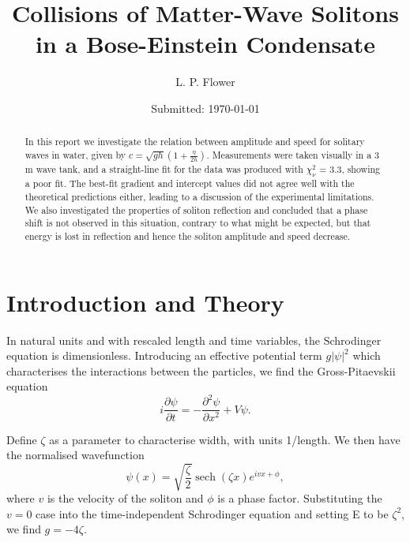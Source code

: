 \documentclass[10pt, twocolumn]{revtex4}    %
\DeclareMathOperator{\sech}{sech}		%
\begin{document}
                     


\title{Collisions of Matter-Wave Solitons in a Bose-Einstein Condensate} 
\date{Submitted: \today{}}
\author{L. P. Flower}

\begin{abstract}              
 
In this report we investigate the relation between amplitude and speed for solitary waves in water, given by $c = \sqrt{gh} \left(1 + \frac{\eta}{2h} \right)$. Measurements were taken visually in a 3 m wave tank, and a straight-line fit for the data was produced with $\chi_\nu^2$ = 3.3, showing a poor fit. The best-fit gradient and intercept values did not agree well with the theoretical predictions either, leading to a discussion of the experimental limitations. We also investigated the properties of soliton reflection and concluded that a phase shift is not observed in this situation, contrary to what might be expected, but that energy is lost in reflection and hence the soliton amplitude and speed decrease. 

\end{abstract}

\maketitle
\thispagestyle{plain} %



\section{Introduction and Theory} \label{Intro}

In natural units and with rescaled length and time variables, the Schrodinger equation is dimensionless. Introducing an effective potential term $g |\psi|^2$ which characterises the interactions between the particles, we find the Gross-Pitaevskii equation \cite{Gross} \cite{Pitaevskii}
\begin{equation} \label{GPE}
i \frac{\partial \psi}{\partial t} = -\frac{\partial^2 \psi}{\partial x^2} + V \psi.
\end{equation}

Define $\zeta$ as a parameter to characterise width, with units 1/length. We then have the normalised wavefunction 
\begin{equation} 
\psi(x) = \sqrt{\frac{\zeta}{2}} \sech{(\zeta x)} e^{i v x + \phi},
\end{equation}
where $v$ is the velocity of the soliton and $\phi$ is a phase factor. 
Substituting the $v=0$ case into the time-independent Schrodinger equation and setting E to be $\zeta^2$, we find $g=-4\zeta$. 
\end{document}
